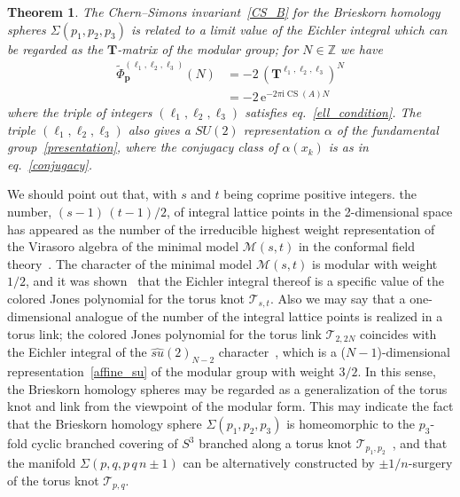 \documentclass[12pt,reqno]{amsart}
\numberwithin{equation}{section}
\newtheorem{theorem}{Theorem}
\DeclareMathOperator{\CS}{CS}
\begin{document}
\begin{theorem}
  The Chern--Simons invariant~\eqref{CS_B} for the Brieskorn homology
  spheres
  $\Sigma(p_1,p_2,p_3)$ is related to a limit value of the Eichler
  integral which can be regarded as the $\mathbf{T}$-matrix of the modular group;
  for $N\in\mathbb{Z}$ we have
  \begin{align}
    \widetilde{\Phi}_{\boldsymbol{p}}^{(\ell_1,\ell_2,\ell_3)}
    (N)
    & =
    -2 \,
    \left(
      \mathbf{T}^{\ell_1 , \ell_2, \ell_3}
    \right)^N
    \nonumber
    \\
    & =
    - 2 \,
    \mathrm{e}^{ - 2 \pi \mathrm{i} \CS(A) N}
    \label{integer_Chern}
  \end{align}
  where the triple of integers $(\ell_1,\ell_2,\ell_3)$
  satisfies eq.~\eqref{ell_condition}.
  The  triple $(\ell_1,\ell_2,\ell_3)$ also gives a
  $SU(2)$ representation
  $\alpha$ of the
  fundamental group~\eqref{presentation},
  where
  the  conjugacy class of  $\alpha(x_k)$ is 
  as in eq.~\eqref{conjugacy}.
\end{theorem}


We should point out that,
with $s$ and $t$ being  coprime positive integers.
the number,
$(s-1) \, (t-1)/2$,
 of integral lattice points
in the 2-dimensional space
has appeared as
the number of the irreducible  highest weight representation of the
Virasoro algebra of the minimal model
$\mathcal{M}(s,t)$ 
in the conformal
field theory~\cite{BPZ84a}.
The  character of the minimal model $\mathcal{M}(s,t)$
is modular with weight $1/2$, and it was
shown~\cite{KHikami03c,KHikami03b} that the Eichler integral thereof
is a specific value of the colored Jones polynomial for the torus knot
$\mathcal{T}_{s,t}$.
Also
we may say that
a one-dimensional analogue of the number of the integral lattice
points
is realized in a torus link;
the colored Jones polynomial for the torus link
$\mathcal{T}_{2,2  N}$
coincides with the Eichler integral of the $\widehat{su}(2)_{N-2}$
character~\cite{KHikami03a},
which is a ($N-1$)-dimensional representation~\eqref{affine_su}
of the modular group  with weight $3/2$.
In this sense, the Brieskorn homology spheres may be regarded as a
generalization of the torus knot and link
from the viewpoint of the modular form.
This may indicate the fact that the Brieskorn homology sphere
$\Sigma(p_1,p_2,p_3)$
is homeomorphic to the 
$p_3$-fold cyclic branched covering of $S^3$ branched along a torus knot
$\mathcal{T}_{p_1,p_2}$~\cite{JMiln75a},
and that
the manifold
$\Sigma(p, q, p \, q \,n \pm 1)$
can be alternatively
constructed  by $\pm 1/n$-surgery of the torus knot $\mathcal{T}_{p,q}$.
\end{document}

